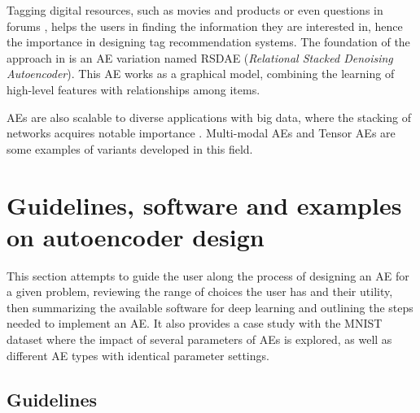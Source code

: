 \documentclass[preprint,5p,compress]{elsarticle}
\begin{document}
Tagging digital resources, such as movies and products \cite{TagRecommendation} or even questions in forums \cite{QUINTA}, helps the users in finding the information they are interested in, hence the importance in designing tag recommendation systems. The foundation of the approach in \cite{RelationalDAE} is an AE variation named  RSDAE (\textit{Relational Stacked Denoising Autoencoder}). This AE works as a graphical model, combining the learning of high-level features with relationships among items.

AEs are also scalable to diverse applications with big data, where the stacking of networks acquires notable importance \cite{SurveyDLbigdata}. Multi-modal AEs and Tensor AEs are some examples of variants developed in this field.

\section{Guidelines, software and examples on autoencoder design}\label{Sec.HowToChoose}

This section attempts to guide the user along the process of designing an AE for a given problem, reviewing the range of choices the user has and their utility, then summarizing the available software for deep learning and outlining the steps needed to implement an AE. It also provides a case study with the MNIST dataset where the impact of several parameters of AEs is explored, as well as different AE types with identical parameter settings.


\subsection{Guidelines}
\end{document}

